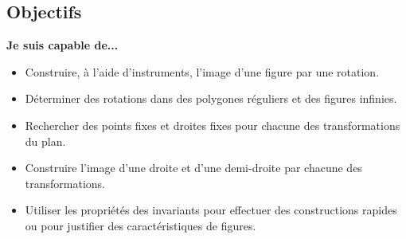 \vspace{0.5cm}
{ \small
	\tcolorbox[colframe=black, colback=white, boxrule=1pt, width=\textwidth]
	\subsection*{Objectifs}


	\textbf{Je suis capable de...}
	\begin{itemize}[label=\checkboxEmpty]
		\item Construire, à l’aide d’instruments, l’image d’une figure par une rotation.
		\item Déterminer des rotations dans des polygones réguliers et des figures infinies.
		\item Rechercher des points fixes et droites fixes pour chacune des transformations du plan.
		\item Construire l’image d’une droite et d’une demi-droite par chacune des transformations.
		\item Utiliser les propriétés des invariants pour effectuer des constructions rapides ou pour justifier des caractéristiques de figures.
	\end{itemize}

	\endtcolorbox
}
